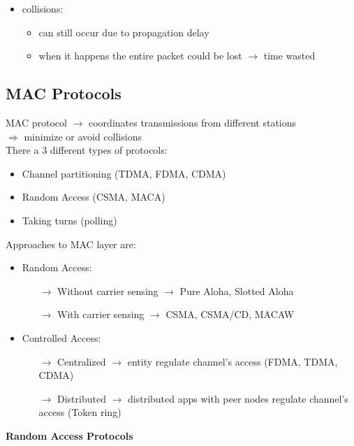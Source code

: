 \begin{itemize}
\begin{itemize}
\begin{itemize}
            \item collisions:
            \begin{itemize}
                \item can still occur due to propagation delay
                \item when it happens the entire packet could be lost $\rightarrow$ time wasted
            \end{itemize}
        \end{itemize}
    \end{itemize}
\end{itemize}

\subsection{MAC Protocols}
MAC protocol $\rightarrow$ coordinates transmissions from
different stations\\ \hspace*{2.5cm}$\Rightarrow$ minimize or avoid collisions\\[0.2cm]
There a 3 different types of protocols:
\begin{itemize}
    \item Channel partitioning (TDMA, FDMA, CDMA)
    \item Random Access (CSMA, MACA)
    \item Taking turns (polling)
\end{itemize}
Approaches to MAC layer are:
\begin{itemize}
    \item Random Access:
    \begin{itemize}
        \item[$\rightarrow$] Without carrier sensing $\rightarrow$ Pure Aloha, Slotted Aloha
        \item[$\rightarrow$] With carrier sensing $\rightarrow$ CSMA, CSMA/CD, MACAW
    \end{itemize}
    \item Controlled Access:
    \begin{itemize}
        \item[$\rightarrow$] Centralized $\rightarrow$ entity regulate channel's access (FDMA, TDMA, CDMA)
        \item[$\rightarrow$] Distributed $\rightarrow$ distributed apps with peer nodes regulate channel's\\ access (Token ring)
    \end{itemize}
\end{itemize}
\textbf{Random Access Protocols}

